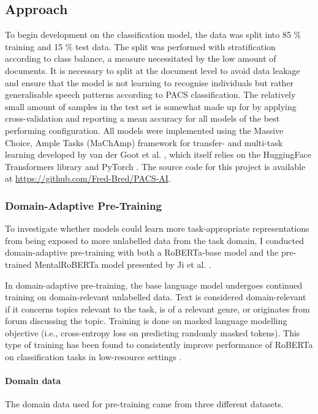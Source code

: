 \documentclass[12pt]{report}
\begin{document}
\subsection{Approach}
To begin development on the classification model, the data was split into 85 \% training and 15 \% test data.
The split was performed with stratification according to class balance, a measure necessitated by the low amount of documents.
It is necessary to split at the document level to avoid data leakage and ensure that the model is not learning to recognise individuals but rather generalisable speech patterns according to PACS classification.
The relatively small amount of samples in the test set is somewhat made up for by applying cross-validation and reporting a mean accuracy for all models of the best performing configuration.
All models were implemented using the Massive Choice, Ample Tasks (MaChAmp) framework for transfer- and multi-task learning developed by van der Goot et al. \citeyear{MaChAmp}, which itself relies on the HuggingFace Transformers library \cite{HuggingFace} and PyTorch \cite{PyTorch}.
The source code for this project is available at \url{https://github.com/Fred-Bred/PACS-AI}.

\subsubsection{Domain-Adaptive Pre-Training}
To investigate whether models could learn more task-appropriate representations from being exposed to more unlabelled data from the task domain, I conducted domain-adaptive pre-training with both a RoBERTa-base model \cite{roberta} and the pre-trained MentalRoBERTa model presented by Ji et al. \citeyear{MentalBERT}.

In domain-adaptive pre-training, the base language model undergoes continued training on domain-relevant unlabelled data.
Text is considered domain-relevant if it concerns topics relevant to the task, is of a relevant genre, or originates from forum discussing the topic.
Training is done on masked language modelling objective (i.e., cross-entropy loss on predicting randomly masked tokens).
This type of training has been found to consistently improve performance of RoBERTa on classification tasks in low-resource settings \cite{Gururangan2020}.

\paragraph*{Domain data}
The domain data used for pre-training came from three different datasets.
\end{document}
